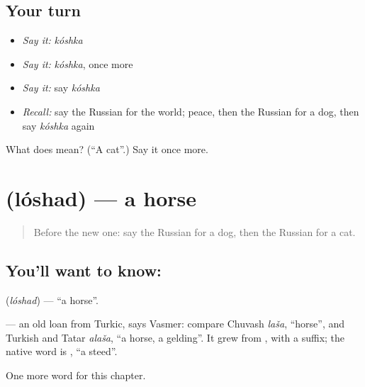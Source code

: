 \subsection*{Your turn}
\begin{itemize}
\raggedright
  \item \emph{Say it:} \emph{kóshka}
  \item \emph{Say it:} \emph{kóshka}, once more
  \item \emph{Say it:} say \emph{kóshka}
  \item \emph{Recall:} say the Russian for the world; peace, then the Russian for a dog, then say \emph{kóshka} again
\end{itemize}

\begin{tcolorbox}[breakable,colback=teal!4,colframe=teal!35!black,title={Before you move on}]
What does  mean? (\textquotedblleft{}A cat\textquotedblright{}.) Say it once more.
\end{tcolorbox}
\section[\texorpdfstring{\ru{лошадь} (lóshad)}{лошадь (lóshad)}]{ (lóshad) — a horse}

\label{lesson:RU-C60-horse}



\begin{quote}
Before the new one: say the Russian for a dog, then the Russian for a cat.
\end{quote}

\subsection*{You'll want to know: }
\textbf{} (\emph{lóshad}) — \textquotedblleft{}a horse\textquotedblright{}.

\begin{cousinweb}
\textbf{} — an old loan from Turkic, says Vasmer: compare Chuvash \emph{laša}, \textquotedblleft{}horse\textquotedblright{}, and Turkish and Tatar \emph{alaša}, \textquotedblleft{}a horse, a gelding\textquotedblright{}. It grew from \emph{}, with a suffix; the native word is \emph{}, \textquotedblleft{}a steed\textquotedblright{}.
\end{cousinweb}

\begin{grammarlens}[title={What you've built}]
One more word for this chapter.
\end{grammarlens}

